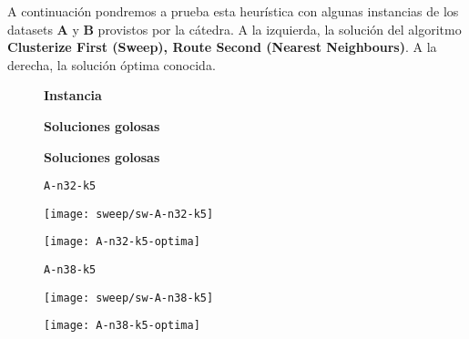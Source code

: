 A continuación pondremos a prueba esta heurística con algunas instancias de los datasets \textbf{A} y \textbf{B} provistos por la cátedra. A la izquierda, la solución del algoritmo \textbf{Clusterize First (Sweep), Route Second (Nearest Neighbours)}. A la derecha, la solución óptima conocida.

\begin{figure}[H]
	\begin{minipage}{0.15\textwidth}
		\centering
		\textbf{Instancia}
	\end{minipage}%
	\begin{minipage}{0.40\textwidth}
		\centering
		\textbf{Soluciones golosas}
	\end{minipage}%
	\hspace{0.03\textwidth}
	\begin{minipage}{0.40\textwidth}
		\centering
		\textbf{Soluciones golosas}
	\end{minipage}%
\end{figure}

\begin{figure}[H]
	\begin{minipage}{0.15\textwidth}
		\centering
		\texttt{A-n32-k5}
	\end{minipage}%
	\begin{minipage}{0.40\textwidth}
		\centering
		\texttt{[image: sweep/sw-A-n32-k5]}\par
	\end{minipage}%
	\hspace{0.03\textwidth}
	\begin{minipage}{0.40\textwidth}
		\centering
		\texttt{[image: A-n32-k5-optima]}\par
	\end{minipage}%
\end{figure}

\begin{figure}[H]
	\begin{minipage}{0.15\textwidth}
		\centering
		\texttt{A-n38-k5}
	\end{minipage}%
	\begin{minipage}{0.40\textwidth}
		\centering
		\texttt{[image: sweep/sw-A-n38-k5]}\par
	\end{minipage}%
	\hspace{0.03\textwidth}
	\begin{minipage}{0.40\textwidth}
		\centering
		\texttt{[image: A-n38-k5-optima]}\par
	\end{minipage}%
\end{figure}

